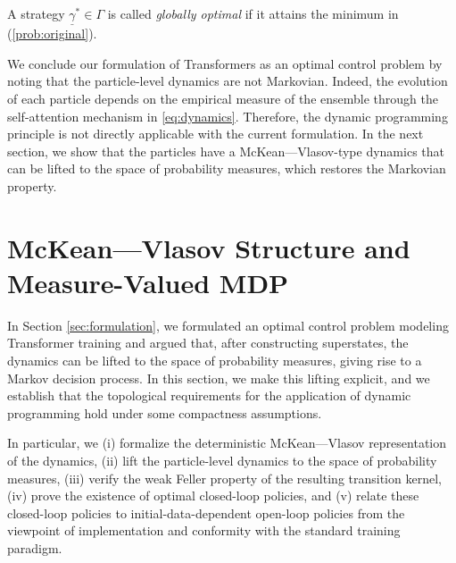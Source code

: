\documentclass[11pt]{article}
\begin{document}
\begin{definition}\label{def:optimality}
    A strategy $\underline{\gamma}^*\in\Gamma$ is called \emph{globally optimal} if it attains the minimum in (\ref{prob:original}).
\end{definition}

We conclude our formulation of Transformers as an optimal control problem by noting that the particle-level dynamics are not Markovian. Indeed, the evolution of each particle depends on the empirical measure of the ensemble through the self-attention mechanism in \eqref{eq:dynamics}. Therefore, the dynamic programming principle is not directly applicable with the current formulation. In the next section, we show that the particles have a McKean---Vlasov-type dynamics that can be lifted to the space of probability measures, which restores the Markovian property.

\section{McKean---Vlasov Structure and Measure-Valued MDP}\label{sec:lifting-section}
In Section \ref{sec:formulation}, we formulated an optimal control problem modeling Transformer training and argued that, after constructing superstates, the dynamics can be lifted to the space of probability measures, giving rise to a Markov decision process. In this section, we make this lifting explicit, and we establish that the topological requirements for the application of dynamic programming hold under some compactness assumptions.

In particular, we (i) formalize the deterministic McKean---Vlasov representation of the dynamics, (ii) lift the particle-level dynamics to the space of probability measures, (iii) verify the weak Feller property of the resulting transition kernel, (iv) prove the existence of optimal closed-loop policies, and (v) relate these closed-loop policies to initial-data-dependent open-loop policies from the viewpoint of implementation and conformity with the standard training paradigm.
\end{document}
